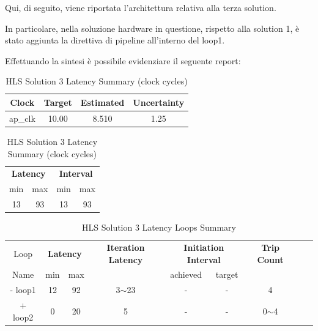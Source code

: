 Qui, di seguito, viene riportata l'architettura relativa alla terza solution.



In particolare, nella soluzione hardware in questione, rispetto alla solution 1, è stato aggiunta la direttiva di pipeline all'interno del loop1.

Effettuando la sintesi è possibile evidenziare il seguente report:\\

\begin{table}[H]
	\centering
	\begin{minipage}[t]{0.45\linewidth}
		\centering
		\begin{tabular}{|c|c|c|c|}
			\hline
			\textbf{Clock} & \textbf{Target} & \textbf{Estimated} & \textbf{Uncertainty} \\
			\hline
			ap\_clk & 10.00 & 8.510 & 1.25 \\
			\hline
		\end{tabular}
		\caption{HLS Solution 3 Timing Summary (ns)}
		\label{tab:hls-solution-3-timing-summary}
	\end{minipage}
	\hfill
	\begin{minipage}[t]{0.45\linewidth}
		\centering
		\begin{tabular}{|c|c|c|c|}
			\hline
			\multicolumn{2}{|c|}{\textbf{Latency}} & \multicolumn{2}{|c|}{\textbf{Interval}} \\
			min & max & min & max \\
			\hline
			13 & 93 & 13 & 93 \\
			\hline
		\end{tabular}
		\caption{HLS Solution 3 Latency Summary (clock cycles)}
		\label{tab:hls-solution-3-latency-summary}
	\end{minipage}
\end{table}

\begin{table}[H]
	\centering
	\begin{tabular}{|c|c|c|c|c|c|c|c|c|}
		\hline
		\multicolumn{1}{|c|}{Loop} & \multicolumn{2}{|c|}{\textbf{Latency}} & \multicolumn{1}{c|}{\textbf{Iteration Latency}} & \multicolumn{2}{c|}{\textbf{Initiation Interval}} & \multicolumn{1}{c|}{\textbf{Trip Count}}  \\
		Name & min & max &  & achieved & target &  \\
		\hline
		- loop1 & 12 & 92 & 3$\sim$23 & - & - & 4 \\
		+ loop2 & 0 & 20 & 5 & - & - & 0$\sim$4 \\
		\hline
	\end{tabular}
	\caption{HLS Solution 3 Latency Loops Summary}
	\label{tab:hls-solution-3-loop-summary}
\end{table}

